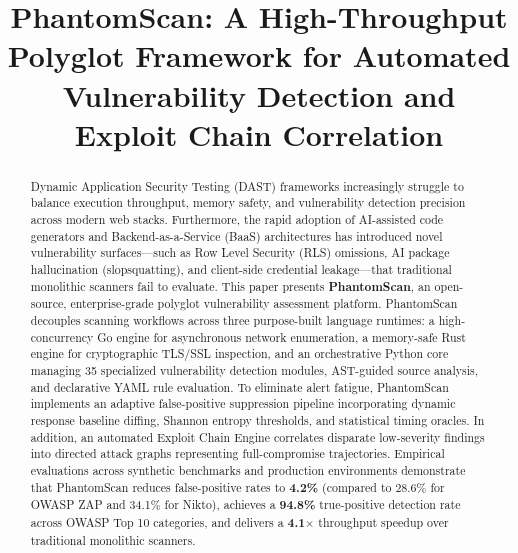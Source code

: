\documentclass[conference]{IEEEtran}
\begin{document}
\title{PhantomScan: A High-Throughput Polyglot Framework for Automated Vulnerability Detection and Exploit Chain Correlation}

\author{
\and
{}
}

\maketitle

\begin{abstract}
Dynamic Application Security Testing (DAST) frameworks increasingly struggle to balance execution throughput, memory safety, and vulnerability detection precision across modern web stacks. Furthermore, the rapid adoption of AI-assisted code generators and Backend-as-a-Service (BaaS) architectures has introduced novel vulnerability surfaces---such as Row Level Security (RLS) omissions, AI package hallucination (slopsquatting), and client-side credential leakage---that traditional monolithic scanners fail to evaluate. This paper presents \textbf{PhantomScan}, an open-source, enterprise-grade polyglot vulnerability assessment platform. PhantomScan decouples scanning workflows across three purpose-built language runtimes: a high-concurrency Go engine for asynchronous network enumeration, a memory-safe Rust engine for cryptographic TLS/SSL inspection, and an orchestrative Python core managing 35 specialized vulnerability detection modules, AST-guided source analysis, and declarative YAML rule evaluation. To eliminate alert fatigue, PhantomScan implements an adaptive false-positive suppression pipeline incorporating dynamic response baseline diffing, Shannon entropy thresholds, and statistical timing oracles. In addition, an automated Exploit Chain Engine correlates disparate low-severity findings into directed attack graphs representing full-compromise trajectories. Empirical evaluations across synthetic benchmarks and production environments demonstrate that PhantomScan reduces false-positive rates to \textbf{4.2\%} (compared to 28.6\% for OWASP ZAP and 34.1\% for Nikto), achieves a \textbf{94.8\%} true-positive detection rate across OWASP Top 10 categories, and delivers a \textbf{4.1$\times$} throughput speedup over traditional monolithic scanners.
\end{abstract}
\end{document}
